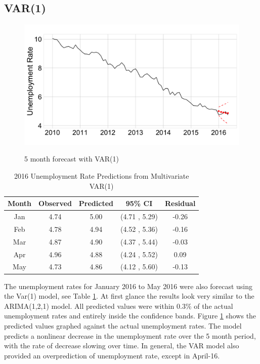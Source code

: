 \documentclass[twoside,twocolumn]{article}
\begin{document}
\subsection{VAR(1)}

   \begin{figure}[htb]
    	\centering
     	\caption{5 month forecast with VAR(1)}
     	\includegraphics[width=\linewidth]{images/varpred}
     	\label{fig:varpred}
 \end{figure}

\begin{table}[ht]
\centering
\small
\caption{2016 Unemployment Rate Predictions from Multivariate VAR(1)}
\label{tab:varforecast}
\begin{tabular}{ccccc}
  \hline
Month & Observed & Predicted& 95\% CI  & Residual \\
  \hline
Jan  & 4.74 & 5.00 & (4.71 , 5.29) & -0.26 \\
Feb & 4.78 & 4.94 & (4.52 , 5.36) & -0.16 \\
Mar  & 4.87 & 4.90 & (4.37 , 5.44) & -0.03 \\
Apr & 4.96 & 4.88 & (4.24 , 5.52) & 0.09 \\
May & 4.73 & 4.86 & (4.12 , 5.60) & -0.13 \\
   \hline
\end{tabular}
\end{table}

The unemployment rates for January 2016 to May 2016 were also forecast using the Var(1) model, see Table \ref{tab:varforecast}.  At first glance the results look very similar to the ARIMA(1,2,1) model. All predicted values were within 0.3\% of the actual unemployment rates and entirely inside the confidence bands.  Figure \ref{fig:varpred} shows the predicted values graphed against the actual unemployment rates. The model predicts a nonlinear decrease in the unemployment rate over the 5 month period, with the rate of decrease slowing over time.  In general, the VAR model also provided an overprediction of unemployment rate, except in April-16.
\end{document}
